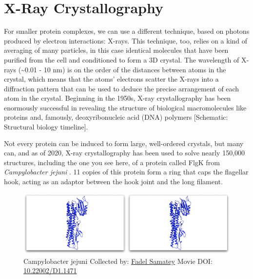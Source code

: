 \documentclass[]{tufte-book}
\begin{document}
\section{X-Ray Crystallography}\label{x-ray-crystallography}

For smaller protein complexes, we can use a different technique, based
on photons produced by electron interactions: X-rays. This technique,
too, relies on a kind of averaging of many particles, in this case
identical molecules that have been purified from the cell and
conditioned to form a 3D crystal. The wavelength of X-rays
(\textasciitilde{}0.01 - 10 nm) is on the order of the distances between
atoms in the crystal, which means that the atoms' electrons scatter the
X-rays into a diffraction pattern that can be used to deduce the precise
arrangement of each atom in the crystal. Beginning in the 1950s, X-ray
crystallography has been enormously successful in revealing the
structure of biological macromolecules like proteins and, famously,
deoxyribonucleic acid (DNA) polymers {[}Schematic: Structural biology
timeline{]}.

Not every protein can be induced to form large, well-ordered crystals,
but many can, and as of 2020, X-ray crystallography has been used to
solve nearly 150,000 structures, including the one you see here, of a
protein called FlgK from \emph{Campylobacter jejuni}
\citep{bulieris2017}. 11 copies of this protein form a ring that caps
the flagellar hook, acting as an adaptor between the hook joint and the
long filament.





\begin{figure}
\includegraphics{movie_stills/1_9} \caption[Campylobacter jejuni Collected by:
\protect\hyperlink{fadel_samatey}{Fadel Samatey} Movie DOI:
\href{https://doi.org/10.22002/D1.1471}{10.22002/D1.1471}]{Campylobacter jejuni Collected by:
\protect\hyperlink{fadel_samatey}{Fadel Samatey} Movie DOI:
\href{https://doi.org/10.22002/D1.1471}{10.22002/D1.1471}}\label{fig:1-9}
\end{figure}
\end{document}
